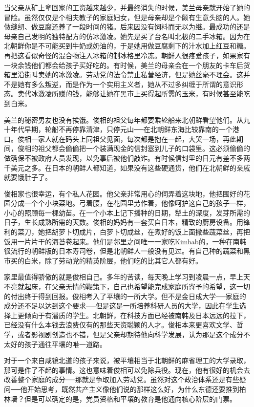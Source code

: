 当父亲从矿上拿回家的工资越来越少，并最终消失的时候，美兰母亲就开始了她的冒险。虽然仅仅是个相夫教子的家庭妇女，但是母亲却是个颇有生意头脑的人。她做缝纫、做豆腐还养了一段时间的猪。后来因没有饲料而无以为继。最成功的还是母亲自己发明的独特配方的仿冰激凌。她先是买了台名叫北极的二手冰箱。因为在北朝鲜你是不可能买到牛奶或奶油的，于是她用做豆腐剩下的汁水加上红豆和糖。再把这看似奇怪的混合物注入冰箱的制冰格里冷冻。朝鲜人很疼爱孩子，如果家有一块余钱他们都会给孩子买好吃的。有时候，美兰的母亲会在一个朋友的卡车后货箱里沿街叫卖她的冰激凌。劳动党的法令禁止私营经济，但是她丝毫不理会。这并不是她有多么叛逆，而是作为一个实用主义者，她从不过多纠缠于所谓的意识形态。卖代冰激凌所赚的钱，能够让她在黑市上买得起所需的玉米，有时候甚至能吃到白米。

美兰的秘密男友也没有挨饿。俊相的祖父每年都要乘轮船来北朝鲜看望他们。从九十年代早期，轮船不再停靠清津，只停元山──在北朝鲜东海比较靠南的一个港口。俊相一家人就在码头上同祖父见面，每次都是抱在一起，大哭一场，再此期间，俊相的祖父都会偷偷把一个装满现金的信封塞到儿子的口袋里。这必须偷偷的做确保不被政府人员发现，以免事后被他们敲诈。有时候信封里的日元有差不多两千美元之多。在日本的朝鲜人都知道，如果没有这些硬通货，他们在北朝鲜的亲戚就要饿肚子了。

俊相家也很幸运，有个私人花园。他父亲非常用心的伺弄着这块地，他把围好的花园分成一个个小块菜地。弓着腰，在花园里劳作着，他像呵护这自己的孩子一样，小心的照顾每一棵幼苗。在一个小本上记下播种的日期，犁土的深度，发芽所需的日子，生长成熟所需的天数。俊相的妈妈有一套买自日本，精致的厨房设备。用锋利的菜刀，她把胡萝卜切成片，白萝卜切成丝，在煮好的饭上面撒些蔬菜丝，再把饭用一片片干的海苔卷起来。他们是邻里之间唯一一家吃Kimbab的，一种在南韩很流行的朝鲜版的日本寿司卷，但是北朝鲜人一般没有见过。有自己种的蔬菜和黑市买的白米，除了劳动党的精英阶层，他们吃的比其它人都有好。

家里最值得骄傲的就是俊相自己。多年的苦读，每天晚上学习到凌晨一点，早上天不亮就起床，在父亲无情的鞭策下，自己也希望能完成家庭所寄予的希望，这一切的付出终于得到回报。俊相考入了平壤的一所大学。但不是金日成大学──家庭的成分还不足以达到这个要求──但是这是一所培养科研人员的大学，因此在学生选择上更倾向于有潜质的学生。北朝鲜，在科技方面已经被南韩及日本远远的拉下，已经没有什么本钱去浪费仅有的那些天资聪颖的人才。俊相本来更喜欢文学、哲学，或者影视剧创造也不错，但是父亲却期待他向科学发展，认为那是这个成分不太好的孩子通往平壤的唯一道路。

对于一个来自咸镜北道的孩子来说，被平壤相当于北朝鲜的麻省理工的大学录取，那可是件了不起的事情。这也意味着俊相可以免除兵役。现在，他有很好的机会去改善整个家庭的成分──那就是争取加入劳动党。虽然对这个政治体系还是有些疑问──他开始思考，既然共产主义像他们说的那样这么好，为什么东德还要推到柏林墙？但是可以确定的是，党员资格和平壤的教育是他通向核心阶层的门票。


